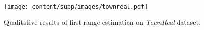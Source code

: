 \begin{figure}[t]
\centering
\texttt{[image: content/supp/images/townreal.pdf]}

\caption{Qualitative results of first range estimation on \textit{TownReal} dataset.}
\label{fig:supp_townreal}

\end{figure}